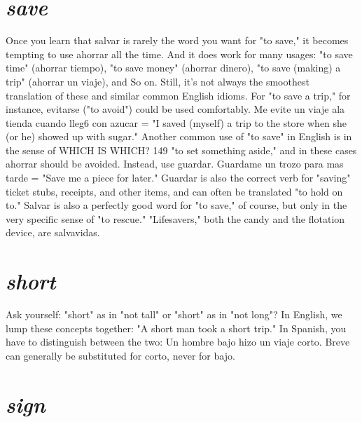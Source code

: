 \section{\emph{save}}

Once you learn that salvar is rarely the word you want for "to
save," it becomes tempting to use ahorrar all the time. And it does
work for many usages: "to save time" (ahorrar tiempo), "to save
money" (ahorrar dinero), "to save (making) a trip" (ahorrar un viaje),
and So on. Still, it's not always the smoothest translation of these and
similar common English idioms. For "to save a trip," for instance, evitarse ("to avoid") could be used comfortably. Me evite un viaje ala
tienda cuando lleg6 con azucar = "I saved (myself) a trip to the store
when she (or he) showed up with sugar."
Another common use of "to save" in English is in the sense of
WHICH IS WHICH? 149
"to set something aside," and in these cases ahorrar should be avoided.
Instead, use guardar. Guardame un trozo para mas tarde = "Save me
a piece for later." Guardar is also the correct verb for "saving" ticket
stubs, receipts, and other items, and can often be translated "to hold
on to." Salvar is also a perfectly good word for "to save," of course, but
only in the very specific sense of "to rescue." "Lifesavers," both the
candy and the flotation device, are salvavidas.

\section{\emph{short}}

Ask yourself: "short" as in "not tall" or "short" as in "not
long"? In English, we lump these concepts together: "A short man
took a short trip." In Spanish, you have to distinguish between the
two: Un hombre bajo hizo un viaje corto. Breve can generally be substituted for corto, never for bajo.

\section{\emph{sign}}

